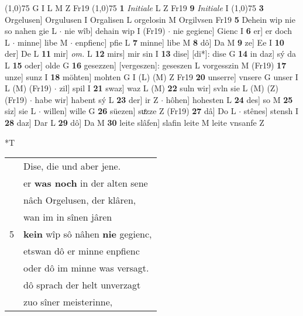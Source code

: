 \documentclass[8pt,a4paper,notitlepage]{article}
\begin{document}
\begin{table}[ht]
\begin{minipage}[t]{0.5\linewidth}
\begin{tabular}{rl}
\end{tabular}
\scriptsize
\line(1,0){75} \newline
G I L M Z Fr19 \newline
\line(1,0){75} \newline
\textbf{1} \textit{Initiale} L Z Fr19  \textbf{9} \textit{Initiale} I  \newline
\line(1,0){75} \newline
\textbf{3} Orgelusen] Orgulusen I Orgalisen L orgelosin M Orgilvsen Fr19 \textbf{5} Dehein wip nie so nahen gie L  $\cdot$ nie wîb] dehain wip I (Fr19)  $\cdot$ nie gegienc] Gienc I \textbf{6} er] er doch L  $\cdot$ minne] libe M  $\cdot$ enpfienc] pfie L \textbf{7} minne] libe M \textbf{8} dô] Da M \textbf{9} ze] Ee I \textbf{10} der] De L \textbf{11} mir] \textit{om.} L \textbf{12} mirs] mir sin I \textbf{13} dise] [di*]: dise G \textbf{14} in daz] sý da L \textbf{15} oder] olde G \textbf{16} gesezzen] [vergeszen]: geseszen L vorgesszin M (Fr19) \textbf{17} unze] sunz I \textbf{18} möhten] mohten G I (L) (M) Z Fr19 \textbf{20} unserre] vnsere G unser I L (M) (Fr19)  $\cdot$ zil] spil I \textbf{21} swaz] waz L (M) \textbf{22} suln wir] svln sie L (M) (Z) (Fr19)  $\cdot$ habe wir] habent sý L \textbf{23} der] ir Z  $\cdot$ hôhen] hohesten L \textbf{24} des] so M \textbf{25} siz] sie L  $\cdot$ willen] wille G \textbf{26} süezen] suͤzze Z (Fr19) \textbf{27} dâ] Do L  $\cdot$ stênes] stensh I \textbf{28} daz] Dar L \textbf{29} dô] Da M \textbf{30} leite slâfen] slafin leite M leite vnsanfe Z \newline
\end{minipage}
\hspace{0.5cm}
\begin{minipage}[t]{0.5\linewidth}
\small
\begin{center}*T
\end{center}
\begin{tabular}{rl}
 & Dise, die und aber jene.\\ 
 & er \textbf{was noch} in der alten sene\\ 
 & nâch Orgelusen, der klâren,\\ 
 & wan im in sînen jâren\\ 
5 & \textbf{kein} wîp sô nâhen \textbf{nie} gegienc,\\ 
 & etswan dô er minne enpfienc\\ 
 & oder dô im minne was versagt.\\ 
 & dô sprach der helt unverzagt\\ 
 & zuo sîner meisterinne,\\ 

\end{tabular}
\end{minipage}
\end{table}
\end{document}
